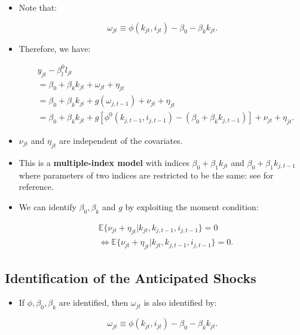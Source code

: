 \documentclass[]{book}
\providecommand{\tightlist}{%
  \setlength{\itemsep}{0pt}\setlength{\parskip}{0pt}}
\theoremstyle{definition}
\theoremstyle{definition}
\theoremstyle{definition}
\theoremstyle{remark}
\begin{document}
\begin{itemize}
\tightlist
\item
  Note that:

  \begin{equation}
  \omega_{jt} \equiv \phi(k_{jt}, i_{jt}) - \beta_0 - \beta_k k_{jt}.
  \end{equation}
\item
  Therefore, we have:

  \begin{equation}
  \begin{split}
  &y_{jt} - \beta_l^0 l_{jt} \\
  &= \beta_0 + \beta_k k_{jt} + \omega_{jt} + \eta_{jt}\\
  &= \beta_0 + \beta_k k_{jt} + g(\omega_{j, t - 1}) + \nu_{jt} + \eta_{jt}\\
  &= \beta_0 + \beta_k k_{jt} + g[\phi^0(k_{j, t - 1}, i_{j, t - 1}) - (\beta_0 + \beta_k k_{j, t - 1})] + \nu_{jt} + \eta_{jt}.
  \end{split}
  \end{equation}
\item
  \(\nu_{jt}\) and \(\eta_{jt}\) are independent of the covariates.
\item
  This is a \textbf{multiple-index model} with indices
  \(\beta_0 + \beta_1 k_{jt}\) and \(\beta_0 + \beta_1 k_{j, t - 1}\)
  where parameters of two indices are restricted to be the same: see
  \citet{Ichimura2007} for reference.
\item
  We can identify \(\beta_0, \beta_k\) and \(g\) by exploiting the
  moment condition:

  \begin{equation}
  \begin{split}
  & \mathbb{E}\{\nu_{jt} + \eta_{jt}|k_{jt}, k_{j, t - 1}, i_{j, t - 1}\} = 0\\
  & \Leftrightarrow \mathbb{E}\{\nu_{jt} + \eta_{jt}|k_{jt}, k_{j, t - 1}, i_{j, t - 1}\} = 0.
  \end{split}
  \end{equation}
\end{itemize}

\subsection{Identification of the Anticipated
Shocks}\label{identification-of-the-anticipated-shocks}

\begin{itemize}
\tightlist
\item
  If \(\phi, \beta_0, \beta_k\) are identified, then \(\omega_{jt}\) is
  also identified by:

  \begin{equation}
  \omega_{jt} \equiv \phi(k_{jt}, i_{jt}) - \beta_0 - \beta_k k_{jt}.
  \end{equation}
\end{itemize}
\end{document}
